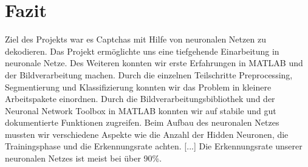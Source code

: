 \section{Fazit}
Ziel des Projekts war es Captchas mit Hilfe von neuronalen Netzen zu dekodieren. Das Projekt ermöglichte uns eine tiefgehende Einarbeitung in neuronale Netze. Des Weiteren konnten wir erste Erfahrungen in MATLAB und der Bildverarbeitung machen. Durch die einzelnen Teilschritte Preprocessing, Segmentierung und Klassifizierung konnten wir das Problem in kleinere Arbeitspakete einordnen. Durch die Bildverarbeitungsbibliothek und der Neuronal Network Toolbox in MATLAB konnten wir auf stabile und gut dokumentierte Funktionen zugreifen. Beim Aufbau des neuronalen Netzes mussten wir verschiedene Aspekte wie die Anzahl der Hidden Neuronen, die Trainingsphase und die Erkennungsrate achten. [...] Die Erkennungsrate unserer neuronalen Netzes ist meist bei über 90\%.